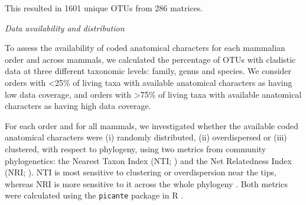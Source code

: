\documentclass[12pt,letterpaper]{article}
\renewcommand{\subsection}[1]{%
\bigskip
\begin{center}
\begin{large}
\normalfont\itshape #1
\end{large}
\end{center}}
\begin{document}
This resulted in 1601 unique OTUs from 286 matrices.

\subsection{Data availability and distribution}
To assess the availability of coded anatomical characters for each mammalian order and across mammals, we calculated the percentage of OTUs with cladistic data at three different taxonomic levels: family, genus and species. %
We consider orders with \textless 25\% of living taxa with available anatomical characters as having low data coverage, and orders with \textgreater 75\% of living taxa with available anatomical characters as having high data coverage. 

For each order and for all mammals, we investigated whether the available coded anatomical characters were (i) randomly distributed, (ii) overdispersed or (iii) clustered, with respect to phylogeny, using two metrics from community phylogenetics: the Nearest Taxon Index (NTI; \cite{webb2002phylogenies}) and the Net Relatedness Index (NRI; \cite{webb2002phylogenies}). 
NTI is most sensitive to clustering or overdispersion near the tips, whereas NRI is more sensitive to it across the whole phylogeny \cite{Cooper2008}. 
Both metrics were calculated using the \texttt{picante} package in R \cite{picante,R}.
\end{document}
